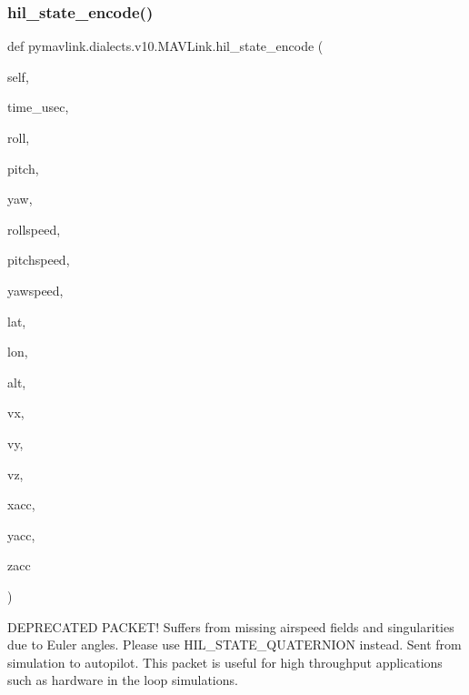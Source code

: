 \begin{DoxyVerb}
\begin{DoxyVerb}
\begin{DoxyVerb}
\begin{DoxyVerb}
\subsubsection{\texorpdfstring{hil\+\_\+state\+\_\+encode()}{hil\_state\_encode()}}
{\footnotesize\ttfamily def pymavlink.\+dialects.\+v10.\+M\+A\+V\+Link.\+hil\+\_\+state\+\_\+encode (\begin{DoxyParamCaption}\item[{}]{self,  }\item[{}]{time\+\_\+usec,  }\item[{}]{roll,  }\item[{}]{pitch,  }\item[{}]{yaw,  }\item[{}]{rollspeed,  }\item[{}]{pitchspeed,  }\item[{}]{yawspeed,  }\item[{}]{lat,  }\item[{}]{lon,  }\item[{}]{alt,  }\item[{}]{vx,  }\item[{}]{vy,  }\item[{}]{vz,  }\item[{}]{xacc,  }\item[{}]{yacc,  }\item[{}]{zacc }\end{DoxyParamCaption})}

\begin{DoxyVerb}DEPRECATED PACKET! Suffers from missing airspeed fields and
singularities due to Euler angles. Please use
HIL_STATE_QUATERNION instead. Sent from simulation to
autopilot. This packet is useful for high throughput
applications such as hardware in the loop simulations.


\end{DoxyVerb}
\end{DoxyVerb}
\end{DoxyVerb}
\end{DoxyVerb}
\end{DoxyVerb}
